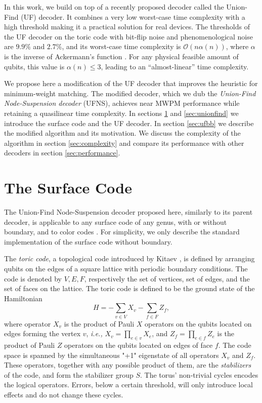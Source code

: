 In this work, we build on top of a recently proposed decoder called the Union-Find (UF) decoder. It combines a very low worst-case time complexity with a high threshold \cites{delfosse2017almost} making it a practical solution for real devices. The thresholds of the UF decoder on the toric code with bit-flip noise and phenomenological noise are $9.9\%$ and $2.7\%$, and its worst-case time complexity is $\mathcal{O}(n\alpha(n))$, where $\alpha$ is the inverse of Ackermann's function \cite{tarjan1975efficiency}. For any physical feasible amount of qubits, this value is $\alpha(n) \leq 3$, leading to an ``almost-linear'' time complexity.

We propose here a modification of the UF decoder that improves the heuristic for minimum-weight matching. The modified decoder, which we dub the \emph{Union-Find Node-Suspension decoder} (UFNS), achieves near MWPM performance while retaining a quasilinear time complexity. In sections \ref{sec:surfacecode} and \ref{sec:unionfind} we introduce the surface code and the UF decoder. In section \ref{sec:ufbb} we describe the modified algorithm and its motivation. We discuss the complexity of the algorithm in section \ref{sec:complexity} and compare its performance with other decoders in section \ref{sec:performance}.  

\section{The Surface Code}\label{sec:surfacecode}

The Union-Find Node-Suspension decoder proposed here, similarly to its parent decoder, is applicable to any surface code of any genus, with or without boundary, and to color codes \cite{delfosse2017almost}. For simplicity, we only describe the standard implementation of the surface code without boundary.

The \emph{toric code}, a topological code introduced by Kitaev \cite{kitaev2003fault}, is defined by arranging qubits on the edges of a square lattice with periodic boundary conditions. The code is denoted by $V,E,F$, respectively the set of vertices, set of edges, and the set of faces on the lattice. The toric code is defined to be the ground state of the Hamiltonian 
\begin{equation}
    H = -\sum_{v \in V} X_v -\sum_{f \in F} Z_f, 
\end{equation}
where operator $X_v$ is the product of Pauli $X$ operators on the qubits located on edges forming the vertex $v$, \emph{i.e.,} $X_v = \prod_{e \in v} X_e$, and $Z_f = \prod_{e \in f} Z_e$ is the product of Pauli $Z$ operators on the qubits located on edges of face $f$. The code space is spanned by the simultaneous "+1" eigenstate of all operators $X_v$ and $Z_f$. These operators, together with any possible product of them, are the \emph{stabilizers} of the code, and form the stabilizer group $S$. The torus' non-trivial cycles encodes the logical operators. Errors, below a certain threshold, will only introduce local effects and do not change these cycles.

